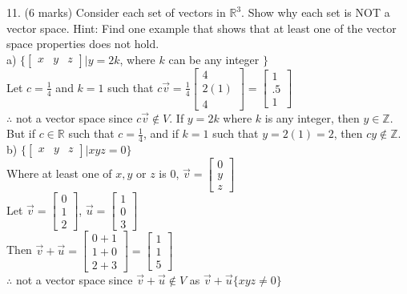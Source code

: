 \documentclass[a4paper]{article}
\begin{document}
11. (6 marks) Consider each set of vectors in $\mathbb{R}^3$. Show why each set is NOT a vector space. Hint: Find one example that shows that at least one of the vector space properties does not hold.\\
a) $\{\begin{bmatrix}
x&y&z
\end{bmatrix} | y = 2k$, where $k$ can be any integer $\}$\\
Let $c = \frac{1}{4}$ and $k = 1$ such that $c\vec{v} = \frac{1}{4}\begin{bmatrix}
4\\
2(1)\\
4
\end{bmatrix} = \begin{bmatrix}
1\\
.5\\
1
\end{bmatrix}$\\
$\therefore$ not a vector space since $c\vec{v} \notin V$. If $y = 2k$ where $k$ is any integer, then $y \in \mathbb{Z}$. But if $c \in \mathbb{R}$ such that $c = \frac{1}{4}$, and if $k = 1$ such that $y = 2(1) = 2$, then $cy \notin \mathbb{Z}$.\\
b) $\{\begin{bmatrix}
x&y&z
\end{bmatrix} | xyz = 0 \}$\\
Where at least one of $x,y$ or $z$ is $0$, $\vec{v} = \begin{bmatrix}
0\\
y\\
z
\end{bmatrix}$\\
Let $\vec{v} = \begin{bmatrix}
0\\
1\\
2
\end{bmatrix}$, $\vec{u} = \begin{bmatrix}
1\\
0\\
3
\end{bmatrix}$\\
Then $\vec{v} + \vec{u} = \begin{bmatrix}
0+1\\
1+0\\
2+3
\end{bmatrix} = \begin{bmatrix}
1\\
1\\
5
\end{bmatrix}$\\
$\therefore$ not a vector space since $\vec{v} + \vec{u} \notin V$ as $\vec{v} + \vec{u} \{xyz \neq 0 \}$\\
\end{document}
